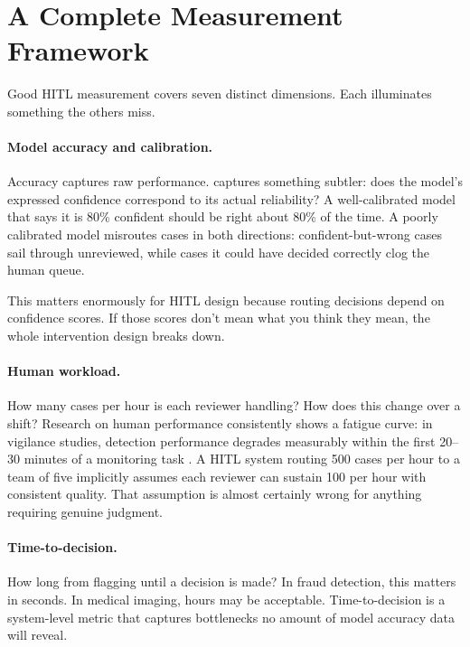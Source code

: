 \section{A Complete Measurement Framework}

Good HITL measurement covers seven distinct dimensions. Each illuminates something the others miss.

\paragraph{Model accuracy and calibration.} Accuracy captures raw performance.  captures something subtler: does the model's expressed confidence correspond to its actual reliability? A well-calibrated model that says it is 80\% confident should be right about 80\% of the time. A poorly calibrated model misroutes cases in both directions: confident-but-wrong cases sail through unreviewed, while cases it could have decided correctly clog the human queue.

This matters enormously for HITL design because routing decisions depend on confidence scores. If those scores don't mean what you think they mean, the whole intervention design breaks down.

\paragraph{Human workload.} How many cases per hour is each reviewer handling? How does this change over a shift? Research on human performance consistently shows a fatigue curve: in vigilance studies, detection performance degrades measurably within the first 20--30 minutes of a monitoring task \autocite{warm2008vigilance}. A HITL system routing 500 cases per hour to a team of five implicitly assumes each reviewer can sustain 100 per hour with consistent quality. That assumption is almost certainly wrong for anything requiring genuine judgment.

\paragraph{Time-to-decision.} How long from flagging until a decision is made? In fraud detection, this matters in seconds. In medical imaging, hours may be acceptable. Time-to-decision is a system-level metric that captures bottlenecks no amount of model accuracy data will reveal.

